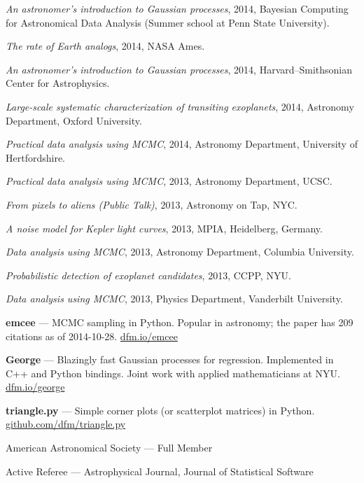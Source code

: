 \documentclass[12pt,letterpaper]{article}
\begin{document}
\begin{list}{}{\cvlist}
\item \emph{An astronomer's introduction to Gaussian processes},
    2014, Bayesian Computing for Astronomical Data Analysis (Summer school at
    Penn State University).

\item \emph{The rate of Earth analogs},
    2014, NASA Ames.

\item \emph{An astronomer's introduction to Gaussian processes},
    2014, Harvard--Smithsonian Center for Astrophysics.

\item \emph{Large-scale systematic characterization of transiting exoplanets},
    2014, Astronomy Department, Oxford University.

\item \emph{Practical data analysis using MCMC},
    2014, Astronomy Department, University of Hertfordshire.

\item \emph{Practical data analysis using MCMC},
    2013, Astronomy Department, UCSC.

\item \emph{From pixels to aliens (Public Talk)},
    2013, Astronomy on Tap, NYC.

\item \emph{A noise model for Kepler light curves},
    2013, MPIA, Heidelberg, Germany.

\item \emph{Data analysis using MCMC},
    2013, Astronomy Department, Columbia University.

\item \emph{Probabilistic detection of exoplanet candidates},
    2013, CCPP, NYU.

\item \emph{Data analysis using MCMC},
    2013, Physics Department, Vanderbilt University.
\end{list}

\begin{list}{}{\cvlist}

\item {\bf emcee} ---
    MCMC sampling in Python. Popular in astronomy; the paper has 209 citations
    as of 2014-10-28. \url{dfm.io/emcee}

\item {\bf George} ---
    Blazingly fast Gaussian processes for regression. Implemented in C++ and
    Python bindings. Joint work with applied mathematicians at NYU.
    \url{dfm.io/george}

\item {\bf triangle.py} ---
    Simple corner plots (or scatterplot matrices) in Python.
    \url{github.com/dfm/triangle.py}


\end{list}


\begin{list}{}{\cvlist}
\item American Astronomical Society --- Full Member
\item Active Referee --- Astrophysical Journal, Journal of Statistical Software
\end{list}
\end{document}
